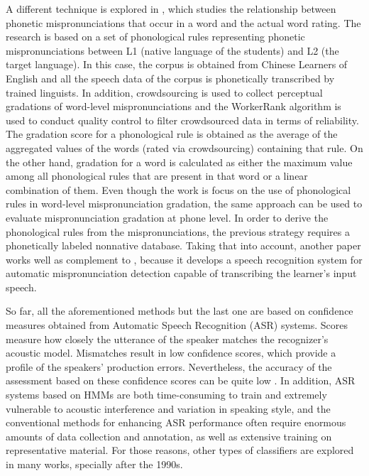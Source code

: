 A different technique is explored in \cite{phonological_rules}, which
studies the relationship between phonetic mispronunciations that occur in a word
and the actual word rating. The research is based on a set of phonological rules
representing phonetic mispronunciations between L1 (native language of the students)
and L2 (the target language). In this case, the corpus is obtained from Chinese Learners
of English and all the speech data of the corpus is phonetically transcribed by trained linguists.
In addition, crowdsourcing is used to collect perceptual gradations of word-level
mispronunciations and the WorkerRank algorithm is used to conduct quality control to filter
crowdsourced data in terms of reliability. The gradation score for a phonological rule
is obtained as the average of the aggregated values of the words (rated via crowdsourcing)
containing that rule. On the other hand, gradation for a word is calculated as either
the maximum value among all phonological rules that are present in
that word or a linear combination
of them. Even though the work is focus on the use of phonological rules in word-level
mispronunciation gradation, the same approach can be used to evaluate mispronunciation
gradation at phone level. In order to derive the phonological rules from the mispronunciations,
the previous strategy requires a phonetically labeled nonnative database.
Taking that into account, another paper \cite{phonological_rules_2} works well as complement
to \cite{phonological_rules}, because it develops a speech recognition system for automatic
mispronunciation detection capable of transcribing the learner's input speech.

So far, all the aforementioned methods but the last one are based on confidence measures
obtained from Automatic Speech Recognition (ASR) systems.
Scores measure how closely the utterance of the speaker matches the recognizer's
acoustic model. Mismatches result in low confidence scores, which provide a profile of the
speakers' production errors. Nevertheless, the accuracy of the assessment based on these
confidence scores can be quite low \cite{landmark_svm}.
In addition, ASR systems based on HMMs are both time-consuming to train and extremely vulnerable to
acoustic interference and variation in speaking style, and the conventional methods for
enhancing ASR performance often require enormous amounts of data collection and annotation,
as well as extensive training on representative material.
For those reasons, other types of classifiers are explored in many works, specially after
the 1990s.

